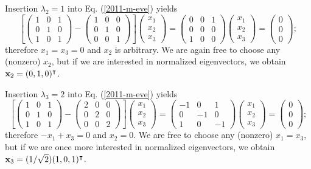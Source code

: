 {Insertion  $\lambda_2=1$ into Eq. (\ref{2011-m-eve}) yields
\begin{equation}
\left[
\begin{pmatrix}
1&0&1\\
0&1&0\\
1&0&1
\end{pmatrix}  -
\begin{pmatrix}
1&0&0\\
0&1&0\\
0&0&1
\end{pmatrix}
\right]
\begin{pmatrix}
x_1\\
x_2\\
x_3
\end{pmatrix}
=
\begin{pmatrix}
0&0&1\\
0&0&0\\
1&0&0
\end{pmatrix}
\begin{pmatrix}
x_1\\
x_2\\
x_3
\end{pmatrix}
=
\begin{pmatrix}
0\\
0\\
0
\end{pmatrix}
;
\end{equation}
therefore $x_1=x_3=0$ and $x_2$ is arbitrary.
We are again free to choose any (nonzero) $x_2$,
but if we are interested in normalized eigenvectors, we obtain
${\bf x}_2 = (0,1,0)^\intercal $.


Insertion  $\lambda_3=2$ into Eq. (\ref{2011-m-eve}) yields
\begin{equation}
\left[
\begin{pmatrix}
1&0&1\\
0&1&0\\
1&0&1
\end{pmatrix}  -
\begin{pmatrix}
2&0&0\\
0&2&0\\
0&0&2
\end{pmatrix}
\right]
\begin{pmatrix}
x_1\\
x_2\\
x_3
\end{pmatrix}
=
\begin{pmatrix}
-1&0&1\\
0&-1&0\\
1&0&-1
\end{pmatrix}
\begin{pmatrix}
x_1\\
x_2\\
x_3
\end{pmatrix}
=
\begin{pmatrix}
0\\
0\\
0
\end{pmatrix}
;
\end{equation}
therefore $-x_1+x_3=0$ and $x_2=0$.
We are free to choose any (nonzero) $x_1=x_3$,
but if we are once more interested in normalized eigenvectors, we obtain
${\bf x}_3 =(1/\sqrt{2})(1,0,1)^\intercal $.

}
